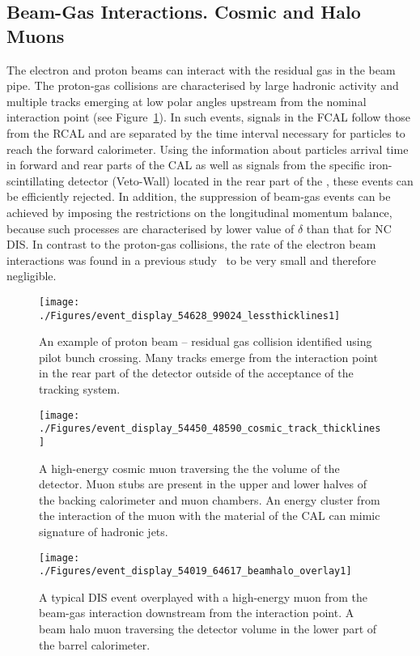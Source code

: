 \subsection{Beam-Gas Interactions. Cosmic and Halo Muons}
\label{subsec:beamgasfeatures}
The electron and proton beams can interact with the residual gas in the beam pipe. The proton-gas collisions are characterised by large hadronic activity and multiple tracks emerging at low polar angles upstream from the nominal interaction point (see Figure~\ref{fig:beamgaseventdisplay}). In such events, signals in the FCAL follow those from the RCAL and are separated by the time interval necessary for particles to reach the forward calorimeter. Using the information about particles arrival time in forward and rear parts of the CAL as well as signals from the specific iron-scintillating detector (Veto-Wall) located in the rear part of the \zeus, these events can be efficiently rejected. In addition, the suppression of beam-gas events can be achieved by imposing the restrictions on the longitudinal momentum balance, because such processes are characterised by lower value of $\delta$ than that for NC DIS. In contrast to the proton-gas collisions, the rate of the electron beam interactions was found in a previous study~\cite{thesis:moritz:2001} to be very small and therefore negligible.

\begin{figure}[ht]
	\centering
	\texttt{[image: ./Figures/event\_display\_54628\_99024\_lessthicklines1]} 
	\caption{An example of proton beam -- residual gas collision identified using pilot bunch crossing. Many tracks emerge from the interaction point in the rear part of the \zeus detector outside of the acceptance of the tracking system.}
	\label{fig:beamgaseventdisplay}
\end{figure}

\begin{figure}[htbp]
	\centering
	\texttt{[image: ./Figures/event\_display\_54450\_48590\_cosmic\_track\_thicklines]} 
	\caption{A high-energy cosmic muon traversing the the volume of the \zeus detector. Muon stubs are present in the upper and lower halves of the backing calorimeter and muon chambers. An energy cluster from the interaction of the muon with the material of the CAL can mimic signature of hadronic jets.}
	\label{fig:cosmiceventdisplay}
\end{figure}

\begin{figure}[htbp!]
	\centering
	\texttt{[image: ./Figures/event\_display\_54019\_64617\_beamhalo\_overlay1]} 
	\caption{A typical DIS event overplayed with a high-energy muon from the beam-gas interaction downstream from the interaction point. A beam halo muon traversing the detector volume in the lower part of the barrel calorimeter.}
	\label{fig:beamhaloeventdisplay}
\end{figure}

